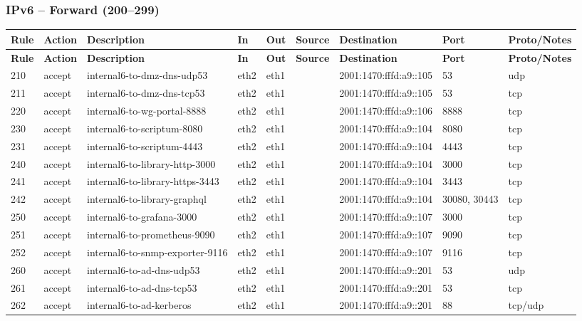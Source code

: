 \documentclass[a4paper,11pt]{article}
\begin{document}
\begin{landscape}
\subsubsection{IPv6 -- Forward (200--299)}
\begin{longtable}{|l|l|l|l|l|l|l|p{2.2cm}|l|}
\hline
\textbf{Rule} & \textbf{Action} & \textbf{Description} & \textbf{In} & \textbf{Out} & \textbf{Source} & \textbf{Destination} & \textbf{Port} & \textbf{Proto/Notes} \\
\hline
\endfirsthead
\hline
\textbf{Rule} & \textbf{Action} & \textbf{Description} & \textbf{In} & \textbf{Out} & \textbf{Source} & \textbf{Destination} & \textbf{Port} & \textbf{Proto/Notes} \\
\hline
\endhead
210 & accept & internal6-to-dmz-dns-udp53 & eth2 & eth1 & & 2001:1470:fffd:a9::105 & 53 & udp \\
211 & accept & internal6-to-dmz-dns-tcp53 & eth2 & eth1 & & 2001:1470:fffd:a9::105 & 53 & tcp \\
220 & accept & internal6-to-wg-portal-8888 & eth2 & eth1 & & 2001:1470:fffd:a9::106 & 8888 & tcp \\
230 & accept & internal6-to-scriptum-8080 & eth2 & eth1 & & 2001:1470:fffd:a9::104 & 8080 & tcp \\
231 & accept & internal6-to-scriptum-4443 & eth2 & eth1 & & 2001:1470:fffd:a9::104 & 4443 & tcp \\
240 & accept & internal6-to-library-http-3000 & eth2 & eth1 & & 2001:1470:fffd:a9::104 & 3000 & tcp \\
241 & accept & internal6-to-library-https-3443 & eth2 & eth1 & & 2001:1470:fffd:a9::104 & 3443 & tcp \\
242 & accept & internal6-to-library-graphql & eth2 & eth1 & & 2001:1470:fffd:a9::104 & 30080, 30443 & tcp \\
250 & accept & internal6-to-grafana-3000 & eth2 & eth1 & & 2001:1470:fffd:a9::107 & 3000 & tcp \\
251 & accept & internal6-to-prometheus-9090 & eth2 & eth1 & & 2001:1470:fffd:a9::107 & 9090 & tcp \\
252 & accept & internal6-to-snmp-exporter-9116 & eth2 & eth1 & & 2001:1470:fffd:a9::107 & 9116 & tcp \\
260 & accept & internal6-to-ad-dns-udp53 & eth2 & eth1 & & 2001:1470:fffd:a9::201 & 53 & udp \\
261 & accept & internal6-to-ad-dns-tcp53 & eth2 & eth1 & & 2001:1470:fffd:a9::201 & 53 & tcp \\
262 & accept & internal6-to-ad-kerberos & eth2 & eth1 & & 2001:1470:fffd:a9::201 & 88 & tcp/udp \\

\end{longtable}
\end{landscape}
\end{document}
